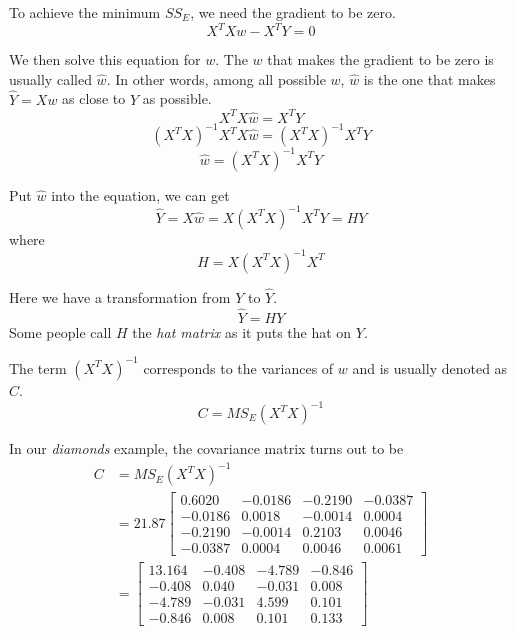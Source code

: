 \documentclass[
	letterpaper
]{article}
\begin{document}
To achieve the minimum $SS_E$, we need the gradient to be zero.
\begin{equation}
X^T X w - X^T Y = 0
\end{equation}

We then solve this equation for $w$.
The $w$ that makes the gradient to be zero is usually called $\hat w$.
In other words, among all possible $w$, $\hat w$ is the one that makes $\hat Y = Xw$ as close to $Y$ as possible.
\begin{equation}
X^T X \hat w = X^T Y
\end{equation}
\begin{equation}
 (X^T X)^{-1} X^T X \hat w= (X^T X)^{-1} X^T Y
\end{equation}
\begin{equation}
\hat w= (X^T X)^{-1}X^T Y
\end{equation}


Put $\hat w$ into the equation, we can get
\begin{equation}
\hat Y = X\hat w= X(X^T X)^{-1}X^T Y=HY
\end{equation}
where
\begin{equation}
H= X(X^T X)^{-1}X^T
\end{equation}

Here we have a transformation from $Y$ to $\hat Y$.
\begin{equation}
\hat Y  = HY
\end{equation}
Some people call $H$ the \textit{hat matrix} as it puts the hat on $Y$.

The term $(X^T X)^{-1}$ corresponds to the variances of $w$ and is usually denoted as $C$.
\begin{equation}
C = MS_E (X^T X)^{-1}
\end{equation}

In our \textit{diamonds} example, the covariance matrix turns out to be
\begin{equation}
\begin{split}
C &= MS_E (X^T X)^{-1}\\
& = 21.87
\begin{bmatrix}
0.6020 & -0.0186 & -0.2190 & -0.0387\\
-0.0186 & 0.0018 & -0.0014 & 0.0004\\
-0.2190 & -0.0014 & 0.2103 & 0.0046\\
-0.0387 & 0.0004 & 0.0046 & 0.0061
\end{bmatrix}\\
& = 
\begin{bmatrix}
13.164 & -0.408 & -4.789 & -0.846\\
-0.408 & 0.040 & -0.031 & 0.008\\
-4.789& -0.031 & 4.599 & 0.101\\
-0.846 & 0.008 & 0.101 & 0.133
\end{bmatrix}\\
\end{split}
\end{equation}
\end{document}
